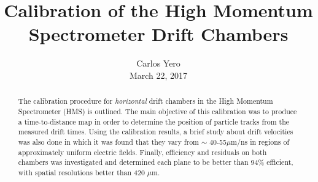 \documentclass[journal, a4paper]{IEEEtran}
\begin{document}
\title{\Huge Calibration of the High Momentum Spectrometer Drift Chambers}
\author{Carlos Yero\\March 22, 2017}
\maketitle
\vspace{1mm}
\begin{abstract}
The calibration procedure for \textit{horizontal} drift chambers in the High Momentum Spectrometer (HMS) is outlined. The main
objective of this calibration was to produce a time-to-distance map in order to determine the position of
particle tracks from the measured drift times. Using the calibration results, a brief study about drift velocities was
also done in which it was found that they vary from $\sim$ 40-55$\mu$m/ns in regions of approximately uniform electric fields.
Finally, efficiency and residuals on both chambers was investigated and determined each plane to be better than
94\% efficient, with spatial resolutions better than 420 $\mu$m.
\end{abstract}
\end{document}
